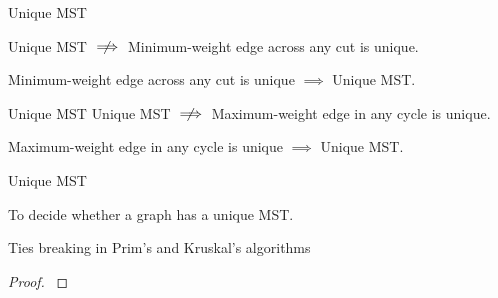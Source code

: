 \begin{frame}{}
  \begin{exampleblock}{Unique MST }
    \centerline{Unique MST $\centernot\implies$ Minimum-weight edge across any cut is unique.}
  \end{exampleblock}

  \pause

  \pause
  \begin{theorem}
    Minimum-weight edge across any cut is unique $\implies$ Unique MST.
  \end{theorem}
\end{frame}

\begin{frame}{}
  \begin{exampleblock}{Unique MST }
    Unique MST $\centernot\implies$ Maximum-weight edge in any cycle is unique.
  \end{exampleblock}

  \pause

  \pause
  \begin{theorem}[Conjecture]
    Maximum-weight edge in any cycle is unique $\implies$ Unique MST.
  \end{theorem}

  \pause
\end{frame}

\begin{frame}{}
  \begin{exampleblock}{Unique MST }
    \centerline{To decide whether a graph has a unique MST.}
  \end{exampleblock}

  \pause
  \vspace{0.80cm}
  \centerline{Ties breaking in Prim's and Kruskal's algorithms}

  \pause
  \vspace{0.50cm}
  \begin{proof}
    \centerline{}
  \end{proof}
\end{frame}
